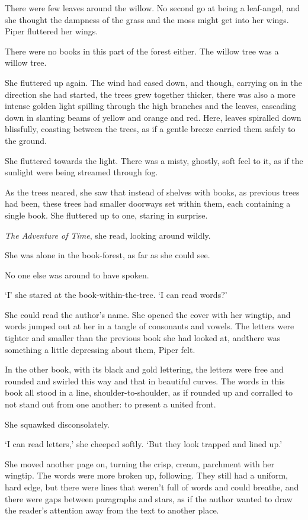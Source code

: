 There were few leaves around the willow. No second go at being a
leaf-angel, and she thought the dampness of the grass and the moss
might get into her wings. Piper fluttered her wings.

There were no books in this part of the forest either. The willow tree
was a willow tree.

She fluttered up again. The wind had eased down, and though, carrying
on in the direction she had started, the trees grew together thicker,
there was also a more intense golden light spilling through the high
branches and the leaves, cascading down in slanting beams of yellow
and orange and red. Here, leaves spiralled down blissfully, coasting
between the trees, as if a gentle breeze carried them safely to the
ground.

She fluttered towards the light. There was a misty, ghostly, soft feel
to it, as if the sunlight were being streamed through fog.

As the trees neared, she saw that instead of shelves with books, as
previous trees had been, these trees had smaller doorways set within
them, each containing a single book. She fluttered up to one, staring
in surprise. %

\textit{The Adventure of Time}, she read, looking around wildly.

She was alone in the book-forest, as far as she could see.

No one else was around to have spoken.

`I\=' she stared at the book-within-the-tree. `I can read words?'

She could read the author's name. She opened the cover with her wingtip,
and words jumped out at her in a tangle of consonants and vowels. The
letters were tighter and smaller than the previous book she had looked
at, and\=there was something a little depressing about them, Piper
felt.

In the other book, with its black and gold lettering, the letters were
free and rounded and swirled this way and that in beautiful
curves. The words in this book all stood in a line,
shoulder-to-shoulder, as if rounded up and corralled to not stand out
from one another: to present a united front.

She squawked disconsolately.

`I can read letters,' she cheeped softly. `But they look trapped and
lined up.'

She moved another page on, turning the crisp, cream, parchment with
her wingtip. The words were more broken up, following. They still had
a uniform, hard edge, but there were lines that weren't full of words
and could breathe, and there were gaps between paragraphs and stars,
as if the author wanted to draw the reader's attention away from the
text to another place.

